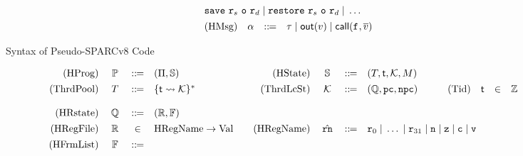 \begin{figure*}[!t]
\[\begin{array}{rcclcrccl}
            \multicolumn{6}{l}
            {
                \csave{} \ \reg{s} \ \oexp \ \reg{d} \sepline 
                \crestore{} \ \reg{s} \ \oexp \ \reg{d} \sepline
                \dots
            } 
            \\
            \\[-8pt]
            \TYPE{(HMsg)} & \hmsg & \define & \empmsg \sepline \outEvt{\val} \sepline 
            \callEvt{\lab{}, \args{\val}} 
        \end{array}
    \]
    \vspace{-1em}
    \caption{Syntax of Pseudo-SPARCv8 Code}
    \label{fig:syntax-of-concur-pseudo-sparc}
    \vspace{-1em}
\end{figure*}
\begin{figure*}[!t]
    \centering
    \small
    \[
        \begin{array}{rcclrcclrccl}
            \TYPE{(HProg)} & \ \HProg \ & \define & 
            (\HMd, \hpstate) &
            \TYPE{(HState)} & \hpstate & \define & 
            \multicolumn{3}{l}
            {
                (\thrdpool, \thrdid, \hthrdlocalst, \Mem)
            }
            \\
            \\[-8pt]
            \TYPE{(ThrdPool)} & \thrdpool & \define & 
            \{ \thrdid \rightsquigarrow \hthrdlocalst \}^{*}
            & \ \ 
            \TYPE{(ThrdLcSt)} & \ \hthrdlocalst \ & \define & 
            (\hRstate, \pc, \npc) 
            & \qquad
            \TYPE{(Tid)} & \thrdid & \in & \Ztype \\
            \\
            \TYPE{(HRstate)} & \hRstate & \define & 
            (\hRfile, \hWstk) \\
            \\[-8pt]
            \TYPE{(HRegFile)} & \hRfile & \in & 
            \TYPE{HRegName} \rightarrow \TYPE{Val} 
            & \quad
            \TYPE{(HRegName)} & \hrn & \define & 
            \multicolumn{5}{l}
            {
                \reg{0} \sepline \dots \sepline \reg{31} \sepline 
                \regn \sepline \regz \sepline \regc \sepline \regv 
            } \\
            \\[-8pt]
            \TYPE{(HFrmList)} & \hWstk & \define & 

\end{array}\]
\end{figure*}
